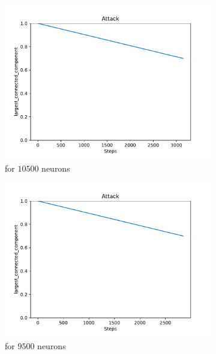 \begin{figure}
	\centering
	\begin{subfigure}[b]{0.45\textwidth}
		\centering
		\includegraphics[width=\textwidth]{Images/plots_ib/ib_20.pdf}
		\caption{for $10500$ neurons}
	\end{subfigure}
	\hfill
	\begin{subfigure}[b]{0.45\textwidth}
		\centering
		\includegraphics[width=\textwidth]{Images/plots_ib/ib_22.pdf}
		\caption{for $9500$ neurons}
	\end{subfigure}
	\\ \vspace{5mm}
	\begin{subfigure}[b]{0.45\textwidth}

\end{subfigure}
\end{figure}

